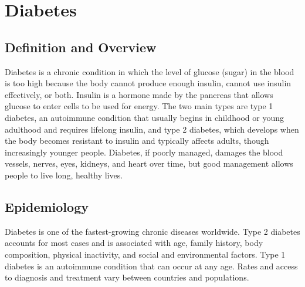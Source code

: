 \chapter{Diabetes}

\section*{Definition and Overview}
Diabetes is a chronic condition in which the level of glucose (sugar) in the blood is too high because the body cannot produce enough insulin, cannot use insulin effectively, or both. Insulin is a hormone made by the pancreas that allows glucose to enter cells to be used for energy. The two main types are type 1 diabetes, an autoimmune condition that usually begins in childhood or young adulthood and requires lifelong insulin, and type 2 diabetes, which develops when the body becomes resistant to insulin and typically affects adults, though increasingly younger people. Diabetes, if poorly managed, damages the blood vessels, nerves, eyes, kidneys, and heart over time, but good management allows people to live long, healthy lives.

\section*{Epidemiology}
Diabetes is one of the fastest-growing chronic diseases worldwide. Type 2 diabetes accounts for most cases and is associated with age, family history, body composition, physical inactivity, and social and environmental factors. Type 1 diabetes is an autoimmune condition that can occur at any age. Rates and access to diagnosis and treatment vary between countries and populations.

